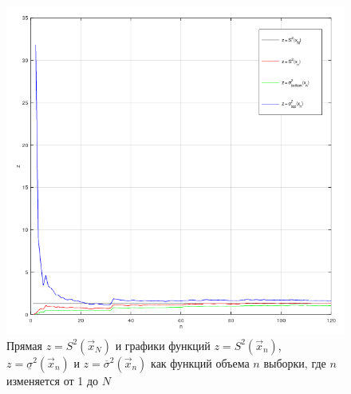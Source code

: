 \begin{figure}[H]
	\begin{center}
		\includegraphics[scale=0.6]{img/Ozn.png}
	\end{center}
	\captionsetup{justification=centering}
	\caption{Прямая $z = S^2(\vec x_{N})$ и графики функций $z = S^2(\vec x_{n})$, $z = \underline{\sigma}^2(\vec x_{n})$ и $z = \overline{\sigma}^2(\vec x_{n})$ как функций объема $n$ выборки, где $n$ изменяется от 1 до $N$}
	\label{img:graph}
\end{figure}
